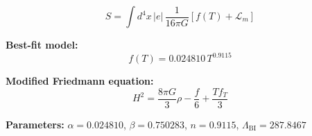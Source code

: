 
\begin{equation}
  S = \int d^4x \, |e| \, \frac{1}{16\pi G} \left[ f(T) + \mathcal{L}_m \right]
\end{equation}

\textbf{Best-fit model:}
\begin{equation}
  f(T) = 0.024810 \, T^{0.9115}
\end{equation}

\textbf{Modified Friedmann equation:}
\begin{equation}
  H^2 = \frac{8\pi G}{3} \rho - \frac{f}{6} + \frac{T f_T}{3}
\end{equation}

\textbf{Parameters:}
$\alpha = 0.024810$, \quad
$\beta = 0.750283$, \quad
$n = 0.9115$, \quad
$\Lambda_{\text{BI}} = 287.8467$